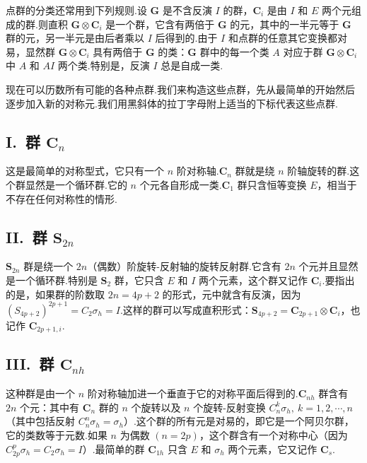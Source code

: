 点群的分类还常用到下列规则.设 $\boldsymbol{G}$ 是不含反演 $I$ 的群，$\boldsymbol{C}_i$ 是由 $I$ 和 $E$ 两个元组成的群.则直积 $\boldsymbol{G}\otimes\boldsymbol{C}_i$ 是一个群，它含有两倍于 $\boldsymbol{G}$ 的元，其中的一半元等于 $\boldsymbol{G}$ 群的元，另一半元是由后者乘以 $I$ 后得到的.由于 $I$ 和点群的任意其它变换都对易，显然群 $\boldsymbol{G}\otimes\boldsymbol{C}_i$ 具有两倍于 $\boldsymbol{G}$ 的类：$\boldsymbol{G}$ 群中的每一个类 $A$ 对应于群 $\boldsymbol{G}\otimes\boldsymbol{C}_i$ 中 $A$ 和 $AI$ 两个类.特别是，反演 $I$ 总是自成一类.

现在可以历数所有可能的各种点群.我们来构造这些点群，先从最简单的开始然后逐步加入新的对称元.我们用黑斜体的拉丁字母附上适当的下标代表这些点群.

\subsection*{I.\ 群 $\boldsymbol{C}_n$}

这是最简单的对称型式，它只有一个 $n$ 阶对称轴.$\boldsymbol{C}_n$ 群就是绕 $n$ 阶轴旋转的群.这个群显然是一个循环群.它的 $n$ 个元各自形成一类.$\boldsymbol{C}_1$ 群只含恒等变换 $E$，相当于不存在任何对称性的情形.

\subsection*{II.\ 群 $\boldsymbol{S}_{2n}$}

$\boldsymbol{S}_{2n}$ 群是绕一个 $2n$（偶数）阶旋转-反射轴的旋转反射群.它含有 $2n$ 个元并且显然是一个循环群.特别是 $\boldsymbol{S}_2$ 群，它只含 $E$ 和 $I$ 两个元素，这个群又记作 $\boldsymbol{C}_i$.要指出的是，如果群的阶数取 $2n=4p+2$ 的形式，元中就含有反演，因为 $(S_{4p+2})^{2p+1}=C_2\sigma_h=I$.这样的群可以写成直积形式：$\boldsymbol{S}_{4p+2}=\boldsymbol{C}_{2p+1}\otimes\boldsymbol{C}_i$，也记作 $\boldsymbol{C}_{2p+1,i}$.

\subsection*{III.\ 群 $\boldsymbol{C}_{nh}$}

这种群是由一个 $n$ 阶对称轴加进一个垂直于它的对称平面后得到的.$\boldsymbol{C}_{nh}$ 群含有 $2n$ 个元：其中有 $\boldsymbol{C}_n$ 群的 $n$ 个旋转以及 $n$ 个旋转-反射变换 $C_n^k\sigma_h,\ k=1,2,\cdots,n$（其中包括反射 $C_n^n\sigma_h=\sigma_h$）.这个群的所有元是对易的，即它是一个阿贝尔群，它的类数等于元数.如果 $n$ 为偶数 $(n=2p)$，这个群含有一个对称中心（因为 $C_{2p}^p\sigma_h=C_2\sigma_h=I$）.最简单的群 $\boldsymbol{C}_{1h}$ 只含 $E$ 和 $\sigma_h$ 两个元素，它又记作 $\boldsymbol{C}_s$.

